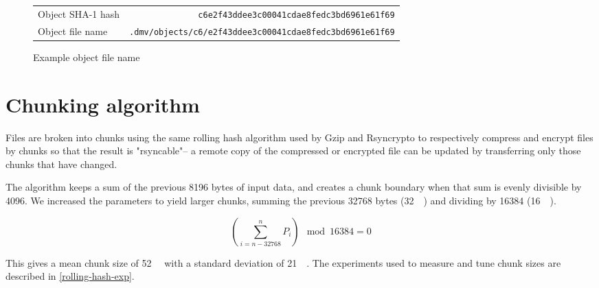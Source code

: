 \begin{figure}[h]
    \caption{Example object file name}
    \label{dir-scheme-example}
    \begin{tabular}{ l r }
        Object SHA-1 hash & \lstinline{c6e2f43ddee3c00041cdae8fedc3bd6961e61f69} \\
        Object file name & \lstinline{.dmv/objects/c6/e2f43ddee3c00041cdae8fedc3bd6961e61f69} \\
    \end{tabular}
\end{figure}

%


\section{Chunking algorithm}\label{chunking-algoritm}

Files are broken into chunks using the same rolling hash algorithm used by Gzip
and Rsyncrypto\cite{rsyncrypto_algorithm} to respectively compress and encrypt
files by chunks so that the result is "rsyncable"-- a remote copy of the
compressed or encrypted file can be updated by transferring only those chunks
that have changed.

The algorithm keeps a sum of the previous \num{8196} bytes of input data, and
creates a chunk boundary when that sum is evenly divisible by \num{4096}. We
increased the parameters to yield larger chunks, summing the previous
\num{32768} bytes (\SI{32}{\kibi\byte}) and dividing by \num{16384}
(\SI{16}{\kibi\relax}).

\begin{equation*}
    \left( \sum_{i = n - \num{32768} }^{n}{P_i} \right) \mod \num{16384} = 0
\end{equation*}

This gives a mean chunk size of \SI{52}{\kibi\byte} with a standard deviation of
\SI{21}{\kibi\byte}. The experiments used to measure and tune chunk sizes are
described in \autoref{rolling-hash-exp}.
